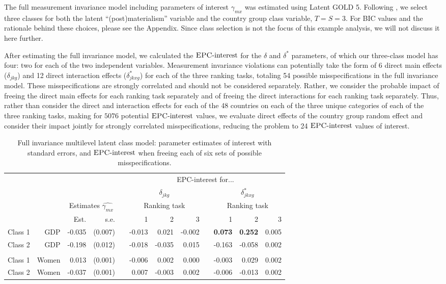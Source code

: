 \documentclass[letterpaper,12pt]{article}
\newcommand{\da}{\textrm{{\sc {EPC}}-interest}}
\begin{document}
The full measurement invariance model  including parameters of interest $\gamma_{mx}$ was estimated using Latent GOLD 5.  Following \citet{moors2007heterogeneity}, we select three  classes for both the latent ``(post)materialism'' variable and the country group class variable, $T = S = 3$. For BIC values and the rationale behind these choices, please see the Appendix. Since class selection is not the focus of this example analysis, we will not discuss it here further. 

After estimating the full invariance model, we calculated the $\da{}$ for the $\delta$ and $\delta^*$ parameters, of which our three-class model has four: two for each of the two independent variables. Measurement invariance violations can potentially take the form of 6 direct main effects ($\delta_{j k g}$) and 12 direct interaction effects ($\delta^{*}_{j k x g}$) for each of the three ranking tasks, totaling 54 possible misspecifications in the full invariance model. These misspecifications are strongly correlated and should not be considered separately. Rather, we consider the probable impact of freeing the direct main effects for each ranking task separately and of freeing the  direct interactions for each ranking task separately. Thus, rather than consider the direct and interaction effects for each of the 48 countries on each of the three unique categories of each of the three ranking tasks, making for $5076$ potential $\da{}$ values, we evaluate direct effects of the country group random effect and consider their impact jointly for strongly correlated misspecifications, reducing the problem to 24 $\da{}$ values of interest.


\begin{table}\begin{small}
	\caption{Full invariance multilevel latent class model: parameter estimates of interest with standard errors, and  $\da{}$ when freeing each of six sets of possible misspecifications. \label{tab:epc-interest-model1}}
	\begin{tabular}{lrrrrrrrrrrr}
	\hline
		&&&&&\multicolumn{7}{c}{EPC-interest for...}\\
	&&&&&\multicolumn{3}{c}{$\delta_{j k g}$} && \multicolumn{3}{c}{$\delta^{*}_{j k x g}$}\\
			\hline
		&&\multicolumn{2}{c}{Estimates $\hat{\gamma_{mx}}$}&&\multicolumn{3}{c}{Ranking task} && \multicolumn{3}{c}{Ranking task}\\
\cline{3-4}\cline{6-8}\cline{10-12}
			&	&	Est.&	s.e.&	&	1  &	2  &	3  &&	  1&	2 &	3\\
				\hline
Class	1&	GDP&	-0.035&	(0.007)&	&	-0.013&	0.021&	-0.002&&	\textbf{0.073}&	\textbf{0.252}&	0.005\\
Class	2&	GDP&	-0.198&	(0.012)&	&	-0.018&	-0.035&	0.015&&	-0.163&	-0.058&	0.002\\
\\
Class	1&	Women&	0.013&	(0.001)&	&	-0.006&	0.002&	0.000&&	-0.003&	0.029&	0.002\\
Class	2&	Women&	-0.037&	(0.001)&	&	0.007&	-0.003&	0.002&&	-0.006&	-0.013&	0.002\\
	\hline
\end{tabular}
\end{small}\end{table}
\end{document}
